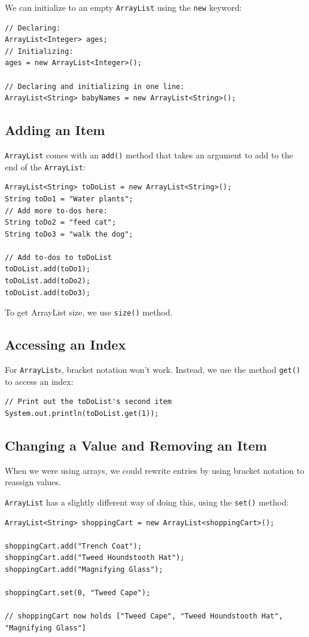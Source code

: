 \documentclass[a4paper, 12pt]{article}
\begin{document}
We can initialize to an empty \verb|ArrayList| using the \verb|new| keyword:
\begin{verbatim}
// Declaring:
ArrayList<Integer> ages;
// Initializing:
ages = new ArrayList<Integer>();

// Declaring and initializing in one line:
ArrayList<String> babyNames = new ArrayList<String>();
\end{verbatim}


\subsection{Adding an Item}
\verb|ArrayList| comes with an \verb|add()| method that takes an argument to add to the end of the \verb|ArrayList|:
\begin{verbatim}
ArrayList<String> toDoList = new ArrayList<String>();
String toDo1 = "Water plants";
// Add more to-dos here:
String toDo2 = "feed cat";
String toDo3 = "walk the dog";

// Add to-dos to toDoList
toDoList.add(toDo1);
toDoList.add(toDo2);
toDoList.add(toDo3);
\end{verbatim}

To get ArrayList size, we use \verb|size()| method.

\subsection{Accessing an Index}
For \verb|ArrayList|s, bracket notation won't work. Instead, we use the method \verb|get()| to access an index:
\begin{verbatim}
// Print out the toDoList's second item
System.out.println(toDoList.get(1));
\end{verbatim}

\subsection{Changing a Value and Removing an Item}
When we were using arrays, we could rewrite entries by using bracket notation to reassign values.

\verb|ArrayList| has a slightly different way of doing this, using the \verb|set()| method:
\begin{verbatim}
ArrayList<String> shoppingCart = new ArrayList<shoppingCart>();

shoppingCart.add("Trench Coat");
shoppingCart.add("Tweed Houndstooth Hat");
shoppingCart.add("Magnifying Glass");

shoppingCart.set(0, "Tweed Cape");

// shoppingCart now holds ["Tweed Cape", "Tweed Houndstooth Hat", "Magnifying Glass"]
\end{verbatim}
\end{document}
